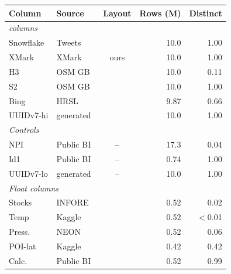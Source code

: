 {\setlength{\tabcolsep}{4pt}%
\begin{tabular}{@{}llcrr@{}}
\toprule
Column & Source & Layout & Rows (M) & Distinct \\
\midrule
\multicolumn{5}{l}{\textit{\SFV{} columns}} \\
Snowflake & Tweets~\cite{tacchi2023cultural}          & \cite{twitter2010snowflake} & 10.0 & 1.00 \\
XMark     & XMark~\cite{schmidt2002xmark}             & ours                        & 10.0 & 1.00 \\
H3        & OSM GB~\cite{osm_geofabrik_2026_gb}       & \cite{uberh3}               & 10.0 & 0.11 \\
S2        & OSM GB~\cite{osm_geofabrik_2026_gb}       & \cite{s2geometry2017}       & 10.0 & 1.00 \\
Bing      & HRSL~\cite{hrsl_labels,tiecke2017mapping} & \cite{microsoft_bing_tiles} & 9.87 & 0.66 \\
UUIDv7-hi & generated                                 & \cite{davis2024rfc}         & 10.0 & 1.00 \\
\midrule
\multicolumn{5}{l}{\textit{Controls}} \\
NPI       & Public BI~\cite{publicbi,vogelsgesang2018get} & --                      & 17.3 & 0.04 \\
Id1       & Public BI~\cite{publicbi,vogelsgesang2018get} & --                      & 0.74 & 1.00 \\
UUIDv7-lo & generated                                 & --                          & 10.0 & 1.00 \\
\midrule
\multicolumn{5}{l}{\textit{Float columns}} \\
Stocks    & INFORE~\cite{infore2020financial,afroozeh2023alp} & \cite{ieee19}               & 0.52 & 0.02 \\
Temp      & Kaggle~\cite{citytemp_kaggle,afroozeh2023alp} & \cite{ieee19}               & 0.52 & $<$0.01 \\
Press.    & NEON~\cite{neon_barometric,afroozeh2023alp} & \cite{ieee19}               & 0.52 & 0.06 \\
POI-lat   & Kaggle~\cite{poi_kaggle,afroozeh2023alp} & \cite{ieee19}               & 0.42 & 0.42 \\
Calc.     & Public BI~\cite{publicbi,vogelsgesang2018get} & \cite{ieee19}           & 0.52 & 0.99 \\
\bottomrule
\end{tabular}}
